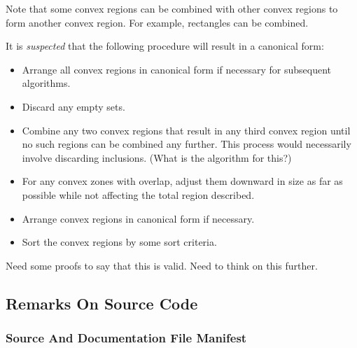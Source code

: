 Note that some convex regions can be combined with other convex regions
to form another convex region.  For example, rectangles can be combined.

It is \emph{suspected} that the following procedure will result in a canonical
form:

\begin{itemize}
\item Arrange all convex regions in canonical form if necessary
      for subsequent algorithms.

\item Discard any empty sets.

\item Combine any two convex regions that result in any third
      convex region until no such regions can be combined
      any further.  This process would necessarily involve
      discarding inclusions.  (What is the algorithm for this?)

\item For any convex zones with overlap, adjust them downward
      in size as far as possible while not affecting the total
      region described.

\item Arrange convex regions in canonical form if necessary.

\item Sort the convex regions by some sort criteria.

\end{itemize}

Need some proofs to say that this is valid.  Need to think on this
further.


\subsection{Remarks On \swname{} Source Code}
\label{siop0:srhs0}


\subsubsection{Source And Documentation File Manifest}
\label{siop0:srhs0:ssdf0}

